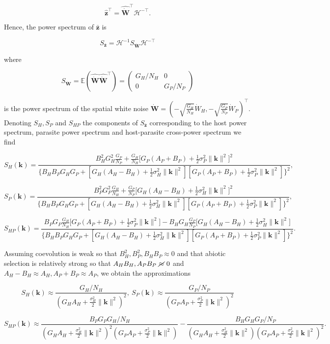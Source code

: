 \documentclass{article}
\begin{document}
\[\hat{\pmb z}^\top=\widehat{\dot{\pmb W}}^\top\mathscr H^{-\top}.\]

Hence, the power spectrum of \(\bar{\pmb z}\) is

\[S_{\bar{\pmb z}}=\mathscr H^{-1}S_{\dot{\pmb W}}\mathscr H^{-\top}\]

where

\[S_{\dot{\pmb W}}=\mathbb E\left(\widehat{\dot{\pmb W}}\widehat{\dot{\pmb W}}^\top\right)=\left(\begin{matrix}G_H/N_H & 0 \\ 0 & G_P/N_P \end{matrix}\right)\]

is the power spectrum of the spatial white noise
\(\dot{\pmb W}=\left(-\sqrt{\tfrac{G_H}{N_H}}{\dot W}_H, -\sqrt{\tfrac{G_P}{N_P}}{\dot W}_P\right)^\top\).
Denoting \(S_H,S_P\) and \(S_{HP}\) the components of
\(S_{\bar{\pmb z}}\) corresponding to the host power spectrum, parasite
power spectrum and host-parasite cross-power spectrum we find

\[S_H(\pmb k)=\frac{B_H^2G_H^2\frac{G_P}{N_P}+\frac{G_H}{N_H}\big[G_P(A_P+B_P)+\frac{1}{2}\sigma_P^2\|\pmb k\|^2\big]^2}{\big\{B_HB_PG_HG_P+[G_H(A_H-B_H)+\frac{1}{2}\sigma_H^2\|\pmb k\|^2][G_P(A_P+B_P)+\frac{1}{2}\sigma_P^2\|\pmb k\|^2]\big\}^2},\]

\[S_P(\pmb k)=\frac{B_P^2G_P^2\frac{G_H}{N_H}+\frac{G_P}{N_P}\big[G_H(A_H-B_H)+\frac{1}{2}\sigma_H^2\|\pmb k\|^2\big]^2}{\big\{B_HB_PG_HG_P+[G_H(A_H-B_H)+\frac{1}{2}\sigma_H^2\|\pmb k\|^2][G_P(A_P+B_P)+\frac{1}{2}\sigma_P^2\|\pmb k\|^2]\big\}^2},\]

\[S_{HP}(\pmb k)=\frac{B_PG_P\frac{G_H}{N_H}\big[G_P(A_P+B_P)+\frac{1}{2}\sigma_P^2\|\pmb k\|^2\big]-B_HG_H\frac{G_P}{N_P}\big[G_H(A_H-B_H)+\frac{1}{2}\sigma_H^2\|\pmb k\|^2\big]}{\big\{B_HB_PG_HG_P+[G_H(A_H-B_H)+\frac{1}{2}\sigma_H^2\|\pmb k\|^2][G_P(A_P+B_P)+\frac{1}{2}\sigma_P^2\|\pmb k\|^2]\big\}^2}.\]

Assuming coevolution is weak so that \(B_H^2,B_P^2,B_HB_P\approx0\) and
that abiotic selection is relatively strong so that
\(A_HB_H,A_PB_P \ \cancel{\approx} \ 0\) and
\(A_H-B_H\approx A_H,A_P+B_P\approx A_P\), we obtain the approximations

\[S_H(\pmb k)\approx\frac{G_H/N_H}{\left(G_HA_H+\frac{\sigma_H^2}{2}\|\pmb k\|^2\right)^2}, \ S_P(\pmb k)\approx\frac{G_P/N_P}{\left(G_PA_P+\frac{\sigma_P^2}{2}\|\pmb k\|^2\right)^2}\]

\[S_{HP}(\pmb k)\approx\frac{B_PG_PG_H/N_H}{\left(G_HA_H+\frac{\sigma_H^2}{2}\|\pmb k\|^2\right)^2\left(G_PA_P+\frac{\sigma_P^2}{2}\|\pmb k\|^2\right)}-\frac{B_HG_HG_P/N_P}{\left(G_HA_H+\frac{\sigma_H^2}{2}\|\pmb k\|^2\right)\left(G_PA_P+\frac{\sigma_P^2}{2}\|\pmb k\|^2\right)^2}.\]
\end{document}
